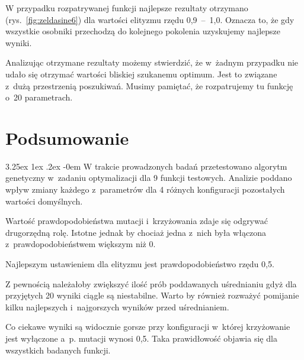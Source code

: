 \documentclass[11pt, a4paper]{article}
\makeatletter
\newcommand{\fbi}{\leavevmode{\parindent=1em\indent}}
\renewcommand\paragraph{\@startsection{paragraph}{5}{\z@}
  {3.25ex \@plus1ex \@minus.2ex}
  {-0em}
  {\normalfont\normalsize\bfseries}}
\makeatother
\begin{document}
\fbi
W przypadku rozpatrywanej funkcji najlepsze rezultaty otrzymano (rys.~\ref{fig:zeldasine6}) dla wartości elityzmu rzędu 0,9~--~1,0. Oznacza to, że gdy wszystkie osobniki przechodzą do kolejnego pokolenia uzyskujemy najlepsze wyniki.

\fbi
Analizując otrzymane rezultaty możemy stwierdzić, że w~żadnym przypadku nie udało się otrzymać wartości bliskiej szukanemu optimum. Jest to związane z~dużą przestrzenią poszukiwań. Musimy pamiętać, że rozpatrujemy tu funkcję o~20 parametrach.

\newpage
\section{Podsumowanie}
\paragraph{}
W trakcie prowadzonych badań przetestowano algorytm genetyczny w~zadaniu optymalizacji dla 9 funkcji testowych. Analizie poddano wpływ zmiany każdego z~parametrów dla 4 różnych konfiguracji pozostałych wartości domyślnych.

\fbi
Wartość prawdopodobieństwa mutacji i~krzyżowania zdaje się odgrywać drugorzędną rolę. Istotne jednak by chociaż jedna z~nich była włączona z~prawdopodobieństwem większym niż 0.

\fbi
Najlepszym ustawieniem dla elityzmu jest prawdopodobieństwo rzędu 0,5.

\fbi
Z pewnością należałoby zwiększyć ilość prób poddawanych uśrednianiu gdyż dla przyjętych 20 wyniki ciągle są niestabilne. Warto by również rozważyć pomijanie kilku najlepszych i~najgorszych wyników przed uśrednianiem.

\fbi
Co ciekawe wyniki są widocznie gorsze przy konfiguracji w~której krzyżowanie jest wyłączone a~p. mutacji wynosi 0,5. Taka prawidłowość objawia się dla wszystkich badanych funkcji.
\end{document}
